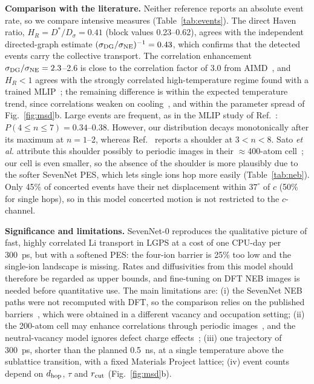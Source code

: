 \documentclass[11pt,a4paper]{article}
\begin{document}
\textbf{Comparison with the literature.} Neither reference reports an absolute event rate, so we compare intensive measures (Table~\ref{tab:events}). The direct Haven ratio, $H_R=D^*/D_\sigma=0.41$ (block values 0.23--0.62), agrees with the independent directed-graph estimate $(\sigma_{\rm DG}/\sigma_{\rm NE})^{-1}=0.43$, which confirms that the detected events carry the collective transport. The correlation enhancement $\sigma_{\rm DG}/\sigma_{\rm NE}=2.3$--2.6 is close to the correlation factor of 3.0 from AIMD~\cite{He2017}, and $H_R<1$ agrees with the strongly correlated high-temperature regime found with a trained MLIP~\cite{Winter2023}; the remaining difference is within the expected temperature trend, since correlations weaken on cooling~\cite{Winter2023}, and within the parameter spread of Fig.~\ref{fig:msd}b. Large events are frequent, as in the MLIP study of Ref.~\cite{Sato2026}: $P(4\le n\le7)=0.34$--0.38. However, our distribution decays monotonically after its maximum at $n=1$--2, whereas Ref.~\cite{Sato2026} reports a shoulder at $3<n<8$. Sato \textit{et al.} attribute this shoulder possibly to periodic images in their $\approx$400-atom cell~\cite{Sato2026}; our cell is even smaller, so the absence of the shoulder is more plausibly due to the softer SevenNet PES, which lets single ions hop more easily (Table~\ref{tab:neb}). Only 45\% of concerted events have their net displacement within $37^\circ$ of $c$ (50\% for single hops), so in this model concerted motion is not restricted to the $c$-channel.

\textbf{Significance and limitations.} SevenNet-0 reproduces the qualitative picture of fast, highly correlated Li transport in LGPS at a cost of one CPU-day per \SI{300}{ps}, but with a softened PES: the four-ion barrier is 25\% too low and the single-ion landscape is missing. Rates and diffusivities from this model should therefore be regarded as upper bounds, and fine-tuning on DFT NEB images is needed before quantitative use. The main limitations are: (i) the SevenNet NEB paths were not recomputed with DFT, so the comparison relies on the published barriers~\cite{He2017}, which were obtained in a different vacancy and occupation setting; (ii) the 200-atom cell may enhance correlations through periodic images~\cite{Grasselli2022,Sato2026}, and the neutral-vacancy model ignores defect charge effects~\cite{Freysoldt2014}; (iii) one trajectory of \SI{300}{ps}, shorter than the planned \SI{0.5}{ns}, at a single temperature above the sublattice transition, with a fixed Materials Project lattice; (iv) event counts depend on $d_{\rm hop}$, $\tau$ and $r_{\rm cut}$ (Fig.~\ref{fig:msd}b).
\end{document}
